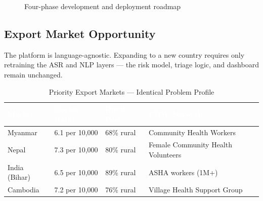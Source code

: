\documentclass[12pt, a4paper]{article}
\begin{document}
\begin{figure}[H]
{
}
\caption{Four-phase development and deployment roadmap}
\label{fig:roadmap}
\end{figure}

\FloatBarrier

\subsection{Export Market Opportunity}

The platform is language-agnostic. Expanding to a new country requires only retraining the ASR and NLP layers — the risk model, triage logic, and dashboard remain unchanged.

\begin{table}[H]
\centering
\caption{Priority Export Markets — Identical Problem Profile}
\small
\begin{tabularx}{\linewidth}{@{}lXXX@{}}
\toprule
\rowcolor{navycolor}
\textcolor{white}{\textbf{Market}} &
\textcolor{white}{\textbf{Doctor Ratio}} &
\textcolor{white}{\textbf{Rural Pop.}} &
\textcolor{white}{\textbf{CHW Network}} \\
\midrule
Myanmar          & 6.1 per 10,000 & 68\% rural & Community Health Workers \\
\rowcolor{gray10}
Nepal            & 7.3 per 10,000 & 80\% rural & Female Community Health Volunteers \\
India (Bihar)    & 6.5 per 10,000 & 89\% rural & ASHA workers (1M+) \\
\rowcolor{gray10}
Cambodia         & 7.2 per 10,000 & 76\% rural & Village Health Support Group \\
\bottomrule
\end{tabularx}
\end{table}
\end{document}
